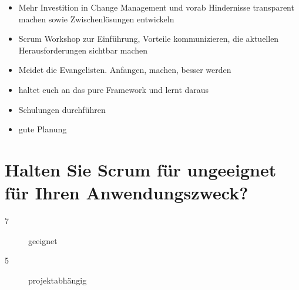 \begin{itemize}
    \item[\openresponse] Mehr Investition in Change Management und vorab Hindernisse transparent machen sowie Zwischenlösungen entwickeln
    \item[\openresponse] Scrum Workshop zur Einführung, Vorteile kommunizieren, die aktuellen Herausforderungen sichtbar machen
    \item[\openresponse] Meidet die Evangelisten. Anfangen, machen, besser werden
    \item[\openresponse] haltet euch an das pure Framework und lernt daraus
    \item[\openresponse] Schulungen durchführen
    \item[\openresponse] gute Planung
\end{itemize}

\section*{Halten Sie Scrum für ungeeignet für Ihren Anwendungszweck?}
\begin{description}
    \item[7 \responsecount] geeignet
    \item[5 \responsecount] projektabhängig
\end{description}


